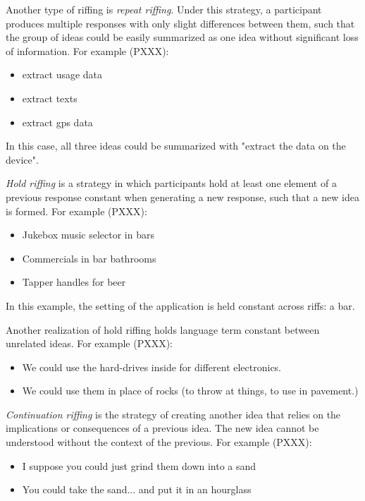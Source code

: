 Another type of riffing is \emph{repeat riffing}. Under this strategy, a participant produces multiple responses with only slight differences between them, such that the group of ideas could be easily summarized as one idea without significant loss of information. For example (PXXX):

\begin{itemize}
    \item extract usage data
    \item extract texts
    \item extract gps data
\end{itemize}

In this case, all three ideas could be summarized with "extract the data on the device".

\emph{Hold riffing} is a strategy in which participants hold at least one element of a previous response constant when generating a new response, such that a new idea is formed. For example (PXXX):

\begin{itemize}
    \item Jukebox music selector in bars
    \item Commercials in bar bathrooms 
    \item Tapper handles for beer 
\end{itemize}

In this example, the setting of the application is held constant across riffs: a bar.

Another realization of hold riffing holds language term constant between unrelated ideas. For example (PXXX):

\begin{itemize}
    \item We could use the hard-drives inside for different electronics.
    \item We could use them in place of rocks (to throw at things, to use in pavement.)
\end{itemize}

\emph{Continuation riffing} is the strategy of creating another idea that relies on the implications or consequences of a previous idea. The new idea cannot be understood without the context of the previous. For example (PXXX):

\begin{itemize}
    \item I suppose you could just grind them down into a sand
    \item You could take the sand... and put it in an hourglass
\end{itemize}

